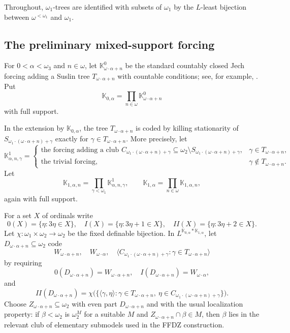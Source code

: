 \documentclass[11pt]{article}
\theoremstyle{plain}
\theoremstyle{definition}
\theoremstyle{remark}
\newcommand{\Kk}{\mathbb K}
\begin{document}
Throughout, $\omega_1$-trees are identified with subsets of $\omega_1$ by the
$L$-least bijection between $\omega^{<\omega_1}$ and $\omega_1$.

\subsection{The preliminary mixed-support forcing}

For $0<\alpha<\omega_3$ and $n\in\omega$, let $\Kk^0_{\omega\cdot\alpha+n}$ be the
standard countably closed Jech forcing adding a Suslin tree
$T_{\omega\cdot\alpha+n}$ with countable conditions; see, for example,
\cite{Jech}.  Put
\[
\Kk_{0,\alpha}=\prod_{n\in\omega}\Kk^0_{\omega\cdot\alpha+n}
\]
with full support.

In the extension by $\Kk_{0,\alpha}$, the tree $T_{\omega\cdot\alpha+n}$ is coded
by killing stationarity of $S_{\omega_1\cdot(\omega\cdot\alpha+n)+\gamma}$ exactly
for $\gamma\in T_{\omega\cdot\alpha+n}$.  More precisely, let
\[
\Kk^1_{\alpha,n,\gamma}=\begin{cases}
\text{the forcing adding a club }C_{\omega_1\cdot(\omega\cdot\alpha+n)+\gamma}
\subseteq\omega_2\setminus S_{\omega_1\cdot(\omega\cdot\alpha+n)+\gamma},&
\gamma\in T_{\omega\cdot\alpha+n},\\
\text{the trivial forcing},&\gamma\notin T_{\omega\cdot\alpha+n}.
\end{cases}
\]
Let
\[
\Kk_{1,\alpha,n}=\prod_{\gamma<\omega_1}\Kk^1_{\alpha,n,\gamma},\qquad
\Kk_{1,\alpha}=\prod_{n\in\omega}\Kk_{1,\alpha,n},
\]
again with full support.

For a set $X$ of ordinals write
\[
0(X)=\{\eta:3\eta\in X\},\quad I(X)=\{\eta:3\eta+1\in X\},\quad
II(X)=\{\eta:3\eta+2\in X\}.
\]
Let $\chi:\omega_1\times\omega_2\to\omega_2$ be the fixed definable bijection.  In
$L^{\Kk_{0,\alpha}*\Kk_{1,\alpha}}$, let
$D_{\omega\cdot\alpha+n}\subseteq\omega_2$ code
\[
W_{\omega\cdot\alpha+n},\quad W_{\omega\cdot\alpha},\quad
\langle C_{\omega_1\cdot(\omega\cdot\alpha+n)+\gamma}:\gamma\in
T_{\omega\cdot\alpha+n}\rangle
\]
by requiring
\[
0(D_{\omega\cdot\alpha+n})=W_{\omega\cdot\alpha+n},\quad
I(D_{\omega\cdot\alpha+n})=W_{\omega\cdot\alpha},
\]
and
\[
II(D_{\omega\cdot\alpha+n})=
\chi\bigl(\{\langle\gamma,\eta\rangle:\gamma\in T_{\omega\cdot\alpha+n},\ 
\eta\in C_{\omega_1\cdot(\omega\cdot\alpha+n)+\gamma}\}\bigr).
\]
Choose $Z_{\omega\cdot\alpha+n}\subseteq\omega_2$ with even part
$D_{\omega\cdot\alpha+n}$ and with the usual localization property: if
$\beta<\omega_2$ is $\omega_2^M$ for a suitable $M$ and
$Z_{\omega\cdot\alpha+n}\cap\beta\in M$, then $\beta$ lies in the relevant club of
elementary submodels used in the FFDZ construction.
\end{document}
